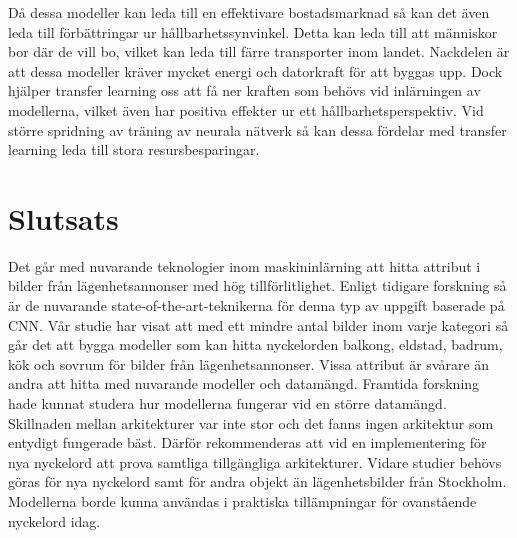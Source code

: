 \documentclass[]{kththesis}
\begin{document}
Då dessa modeller kan leda till en effektivare bostadsmarknad så kan det även leda till förbättringar ur hållbarhetssynvinkel. Detta kan leda till att människor bor där de vill bo, vilket kan leda till färre transporter inom landet. Nackdelen är att dessa modeller kräver mycket energi och datorkraft för att byggas upp. Dock hjälper transfer learning oss att få ner kraften som behövs vid inlärningen av modellerna, vilket även har positiva effekter ur ett hållbarhetsperspektiv. Vid större spridning av träning av neurala nätverk så kan dessa fördelar med transfer learning leda till stora resursbesparingar.

\chapter{Slutsats}
Det går med nuvarande teknologier inom maskininlärning att hitta attribut i bilder från lägenhetsannonser med hög tillförlitlighet. Enligt tidigare forskning så är de nuvarande state-of-the-art-teknikerna för denna typ av uppgift baserade på CNN. Vår studie har visat att med ett mindre antal bilder inom varje kategori så går det att bygga modeller som kan hitta nyckelorden balkong, eldstad, badrum, kök och sovrum för bilder från lägenhetsannonser. Vissa attribut är svårare än andra att hitta med nuvarande modeller och datamängd. Framtida forskning hade kunnat studera hur modellerna fungerar vid en större datamängd. Skillnaden mellan arkitekturer var inte stor och det fanns ingen arkitektur som entydigt fungerade bäst. Därför rekommenderas att vid en implementering för nya nyckelord att prova samtliga tillgängliga arkitekturer. Vidare studier behövs göras för nya nyckelord samt för andra objekt än lägenhetsbilder från Stockholm. Modellerna borde kunna användas i praktiska tillämpningar för ovanstående nyckelord idag.
\end{document}
